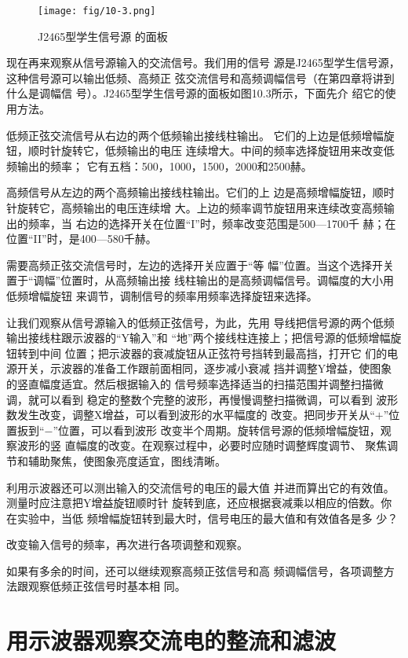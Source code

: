     \begin{figure}[htp]\centering
        \texttt{[image: fig/10-3.png]}
        \caption{J2465型学生信号源
        的面板}
        \end{figure}

现在再来观察从信号源输入的交流信号。我们用的信号
源是J2465型学生信号源，这种信号源可以输出低频、高频正
弦交流信号和高频调幅信号（在第四章将讲到什么是调幅信
号）。J2465型学生信号源的面板如图10.3所示，下面先介
绍它的使用方法。

低频正弦交流信号从右边的两个低频输出接线柱输出。
它们的上边是低频增幅旋钮，顺时针旋转它，低频输出的电压
连续增大。中间的频率选择旋钮用来改变低频输出的频率；
它有五档：500，1000，1500，2000和2500赫。

高频信号从左边的两个高频输出接线柱输出。它们的上
边是高频增幅旋钮，顺时针旋转它，高频输出的电压连续增
大。上边的频率调节旋钮用来连续改变高频输出的频率，当
右边的选择开关在位置“I”时，频率改变范围是500—1700千
赫；在位置“II”时，是400—580千赫。

需要高频正弦交流信号时，左边的选择开关应置于“等
幅”位置。当这个选择开关置于“调幅”位置时，从高频输出接
线柱输出的是高频调幅信号。调幅度的大小用低频增幅旋钮
来调节，调制信号的频率用频率选择旋钮来选择。

让我们观察从信号源输入的低频正弦信号，为此，先用
导线把信号源的两个低频输出接线柱跟示波器的“Y输入”和
“地”两个接线柱连接上；把信号源的低频增幅旋钮转到中间
位置；把示波器的衰减旋钮从正弦符号挡转到最高挡，打开它
们的电源开关，示波器的准备工作跟前面相同，逐步减小衰减
挡并调整Y增益，使图象的竖直幅度适宜。然后根据输入的
信号频率选择适当的扫描范围并调整扫描微调，就可以看到
稳定的整数个完整的波形，再慢慢调整扫描微调，可以看到
波形数发生改变，调整X增益，可以看到波形的水平幅度的
改变。把同步开关从“$+$”位置扳到“$-$”位置，可以看到波形
改变半个周期。旋转信号源的低频增幅旋钮，观察波形的竖
直幅度的改变。在观察过程中，必要时应随时调整辉度调节、
聚焦调节和辅助聚焦，使图象亮度适宜，图线清晰。

利用示波器还可以测出输入的交流信号的电压的最大值
并进而算出它的有效值。测量时应注意把Y增益旋钮顺时针
旋转到底，还应根据衰减乘以相应的倍数。你在实验中，当低
频增幅旋钮转到最大时，信号电压的最大值和有效值各是多
少？

改变输入信号的频率，再次进行各项调整和观察。

如果有多余的时间，还可以继续观察高频正弦信号和高
频调幅信号，各项调整方法跟观察低频正弦信号时基本相
同。

\section{用示波器观察交流电的整流和滤波}

